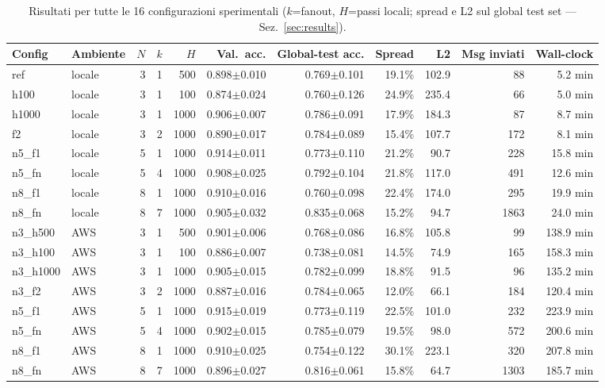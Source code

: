 \begin{table}[t]
  \centering
  \caption{Risultati per tutte le 16 configurazioni sperimentali ($k$=fanout, $H$=passi locali; spread e L2 sul global test set — Sez.~\ref{sec:results}).}
  \label{tab:master}
  \scriptsize
  \begin{tabular}{llrrrrrrrrr}
    \toprule
    \textbf{Config} & \textbf{Ambiente} & $N$ & $k$ & $H$ & \textbf{Val.\ acc.} & \textbf{Global-test acc.} & \textbf{Spread} & \textbf{L2} & \textbf{Msg inviati} & \textbf{Wall-clock} \\
    \midrule
    ref      & locale & 3 & 1 & 500  & 0.898$\pm$0.010 & 0.769$\pm$0.101 & 19.1\% & 102.9 & 88   & 5.2 min \\
    h100     & locale & 3 & 1 & 100  & 0.874$\pm$0.024 & 0.760$\pm$0.126 & 24.9\% & 235.4 & 66   & 5.0 min \\
    h1000    & locale & 3 & 1 & 1000 & 0.906$\pm$0.007 & 0.786$\pm$0.091 & 17.9\% & 184.3 & 87   & 8.7 min \\
    f2       & locale & 3 & 2 & 1000 & 0.890$\pm$0.017 & 0.784$\pm$0.089 & 15.4\% & 107.7 & 172  & 8.1 min \\
    n5\_f1   & locale & 5 & 1 & 1000 & 0.914$\pm$0.011 & 0.773$\pm$0.110 & 21.2\% & 90.7  & 228  & 15.8 min \\
    n5\_fn   & locale & 5 & 4 & 1000 & 0.908$\pm$0.025 & 0.792$\pm$0.104 & 21.8\% & 117.0 & 491  & 12.6 min \\
    n8\_f1   & locale & 8 & 1 & 1000 & 0.910$\pm$0.016 & 0.760$\pm$0.098 & 22.4\% & 174.0 & 295  & 19.9 min \\
    n8\_fn   & locale & 8 & 7 & 1000 & 0.905$\pm$0.032 & 0.835$\pm$0.068 & 15.2\% & 94.7  & 1863 & 24.0 min \\
    \addlinespace
    n3\_h500  & AWS & 3 & 1 & 500  & 0.901$\pm$0.006 & 0.768$\pm$0.086 & 16.8\% & 105.8 & 99   & 138.9 min \\
    n3\_h100  & AWS & 3 & 1 & 100  & 0.886$\pm$0.007 & 0.738$\pm$0.081 & 14.5\% & 74.9  & 165  & 158.3 min \\
    n3\_h1000 & AWS & 3 & 1 & 1000 & 0.905$\pm$0.015 & 0.782$\pm$0.099 & 18.8\% & 91.5  & 96   & 135.2 min \\
    n3\_f2    & AWS & 3 & 2 & 1000 & 0.887$\pm$0.016 & 0.784$\pm$0.065 & 12.0\% & 66.1  & 184  & 120.4 min \\
    n5\_f1    & AWS & 5 & 1 & 1000 & 0.915$\pm$0.019 & 0.773$\pm$0.119 & 22.5\% & 101.0 & 232  & 223.9 min \\
    n5\_fn    & AWS & 5 & 4 & 1000 & 0.902$\pm$0.015 & 0.785$\pm$0.079 & 19.5\% & 98.0  & 572  & 200.6 min \\
    n8\_f1    & AWS & 8 & 1 & 1000 & 0.910$\pm$0.025 & 0.754$\pm$0.122 & 30.1\% & 223.1 & 320  & 207.8 min \\
    n8\_fn    & AWS & 8 & 7 & 1000 & 0.896$\pm$0.027 & 0.816$\pm$0.061 & 15.8\% & 64.7  & 1303 & 185.7 min \\
    \bottomrule
  \end{tabular}
\end{table}

